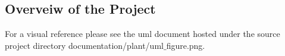 \documentclass[acmsmall]{acmart}
\newcommand{\csfont}[1]{\fontfamily{cmtt}\selectfont #1}
\begin{document}


\maketitle

\begin{multicols}{2}
    \section{Overveiw of the Project}
    For a visual reference please see the uml document hosted under the
    source project directory {\csfont{documentation/plant/uml$\_$figure.png}}.

\end{multicols}
\end{document}

